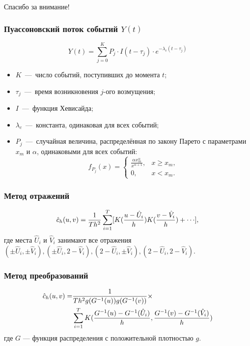 \documentclass[11pt]{beamer}
\begin{document}
\begin{frame}
\begin{center}
Спасибо за внимание!
\end{center}
\end{frame}

\begin{frame}
\frametitle{Пуассоновский поток событий $Y(t)$}
\[Y(t) = \sum_{j = 0}^K P_j \cdot I(t - \tau_j) \cdot e^{-\lambda_c(t - \tau_j)}\]
\begin{itemize}
  \item $K$~---~число событий, поступивших до момента $t$;
  \item $\tau_j$~---~время возникновения $j$-ого возмущения;
  \item $I$~---~функция Хевисайда;
  \item $\lambda_c$~---~константа, одинаковая для всех событий;
  \item $P_j$~---~случайная величина, распределённая по закону Парето с параметрами $x_m$ и $\alpha$, одинаковыми для всех событий:
\[
f_{P_j}(x) = \begin{cases}
\frac{\alpha x_m^\alpha}{x^{\alpha+1} }, &x \geqslant x_m,\\
0, &x < x_m.
\end{cases}
\]
\end{itemize}
\end{frame}

\begin{frame}
\frametitle{Метод отражений}
\[\hat{c}_h(u, v) = \frac{1}{Th^2}\sum_{i=1}^T\sqts{K\brts{\frac{u - \hat{U}_i}{h}}K\brts{\frac{v - \hat{V}_i}{h}} + \cdots},\]
где места $\hat{U}_i$ и $\hat{V}_i$ занимают все отражения $(\pm\hat{U}_i, \pm\hat{V}_i), (\pm\hat{U}_i, 2 - \hat{V}_i), (2- \hat{U}_i, \pm\hat{V}_i), (2 - \hat{U}_i, 2- \hat{V}_i)$.
\end{frame}

\begin{frame}
\frametitle{Метод преобразований}
\begin{align}
\hat{c}_h(u, v) = &\frac{1}{Th^2g(G^{-1}(u))g(G^{-1}(v))}\times \\
&\sum_{i=1}^T K(\frac{G^{-1}(u) - G^{-1}(\hat{U}_i)}{h},\frac{G^{-1}(v) - G^{-1}(\hat{V}_i)}{h})
\end{align}
где $G$ --- функция распределения с положительной плотностью $g$.
\end{frame}
\end{document}
